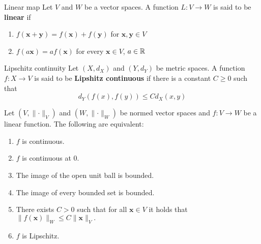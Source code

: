 \documentclass[12pt,a4paper]{article}
\begin{document}
\begin{Definition}{Linear map}{}
	Let $V$ and $W$ be a vector spaces. A function $L:V\to W$ is said to be \textbf{linear} if
	\begin{enumerate}[label=(\roman*)]
		\item $f(\textbf{x}+\textbf{y})=f(\textbf{x})+f(\textbf{y})$ for $\textbf{x},\textbf{y}\in V$
		\item $f(a \textbf{x}) = a f(\textbf{x})$ for every $\textbf{x}\in V$, $a\in \mathbb{R}$
	\end{enumerate}
\end{Definition}

\begin{Definition}{Lipschitz continuity}{}
	Let $(X, d_X)$ and $(Y,d_Y)$ be metric spaces. A function $f:X\to V$ is said to be \textbf{Lipshitz continuous} if there is a constant $C\geq 0$ such that
	$$d_Y(f(x), f(y))\leq C d_X(x,y)$$
\end{Definition}

\begin{Theorem}{}{}
	Let $(V,\lVert\cdot\rVert_V)$ and $(W,\lVert\cdot\rVert_W)$ be normed vector spaces and $f:V\to W$ be a linear function. The following are equivalent:
\begin{enumerate}[label=(\alph*)]
	\item $f$ is continuous.
	\item $f$ is continuous at $0$.
	\item The image of the open unit ball is bounded.
	\item The image of every bounded set is bounded.
	\item There exists $C>0$ such that for all $\textbf{x}\in V$ it holds that 
	$
	\| f(\textbf{x}) \|_W\leq C  \| \textbf{x} \|_V.
	$
	\item $f$ is Lipschitz.
\end{enumerate}
\end{Theorem}

\bigskip
\bigskip
\end{document}

